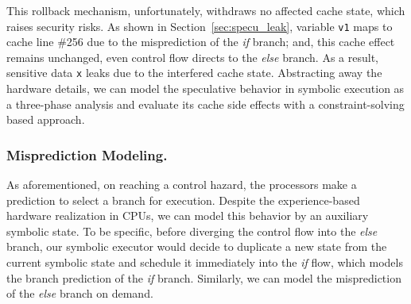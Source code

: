 \documentclass[sigconf]{acmart}
\newcommand\ignore[1]{}
\begin{document}
This rollback mechanism, unfortunately, withdraws no affected cache state, which 
raises security risks. As shown in Section~\ref{sec:specu_leak}, variable \texttt{v1} 
maps to cache line \#256 due to the misprediction of the \textit{if} branch; and, 
this cache effect remains unchanged, even control flow directs to the \textit{else} 
branch. As a result, sensitive data \texttt{x} leaks due to the interfered cache 
state. Abstracting away the hardware details, we can model the speculative behavior 
in symbolic execution as a three-phase analysis and evaluate its cache side effects 
with a constraint-solving based approach. 


\subsubsection{Misprediction Modeling.}
As aforementioned, on reaching a control hazard, the processors make a prediction to
select a branch for execution. Despite the experience-based hardware realization
in CPUs, we can model this behavior by an auxiliary symbolic state. To be specific, 
before diverging the control flow into the \textit{else} branch, our symbolic executor 
would decide to duplicate a new state from the current symbolic state and schedule
it immediately into the \textit{if} flow, which models the branch prediction of the 
\textit{if} branch. Similarly, we can model the misprediction of the \textit{else} 
branch on demand.


\ignore{
Note that we only model speculative execution at branches where both \textit{if} 
and \textit{else} decisions are feasible in terms of the branch conditions. The 
assumption considers the situation where the hazard is dependent on the computation 
over input and cannot be inferred as a \textit{true} or a \textit{false} value in 
advance. In contrast, if the condition is determined to be \textit{true} or 
\textit{false} at the branch point, e.g., the \textit{while} loop head in Figure
\ref{fig:fig2-a}, then the branch decision is deterministic.
}


\ignore{
However, different program inputs might go through various program paths to reach 
a same branch point but trigger divergent decisions. Thus, in practice speculative 
executions at these points do exist and our method complies with the fact.
}
\end{document}
